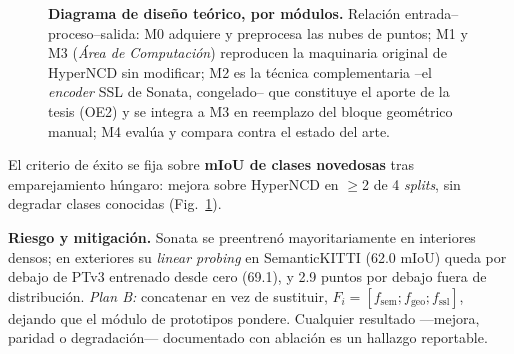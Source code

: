\documentclass[9.5pt,twocolumn,a4paper]{article}
\begin{document}
\begin{figure}[t]
{}
\vspace{-4pt}
\caption{\textbf{Diagrama de diseño teórico, por módulos.} Relación
entrada--proceso--salida: M0 adquiere y preprocesa las nubes de puntos; M1 y
M3 (\emph{Área de Computación}) reproducen la maquinaria original de HyperNCD
sin modificar; M2 es la técnica complementaria --el \emph{encoder} SSL de
Sonata, congelado-- que constituye el aporte de la tesis (OE2) y se integra a
M3 en reemplazo del bloque geométrico manual; M4 evalúa y compara contra el
estado del arte.}
\label{fig:teorico}
\vspace{-6pt}
\end{figure}

El criterio de éxito se fija sobre \textbf{mIoU de clases novedosas} tras
emparejamiento húngaro: mejora sobre HyperNCD en $\geq$2 de 4 \emph{splits},
sin degradar clases conocidas (Fig.~\ref{fig:teorico}).

\textbf{Riesgo y mitigación.} Sonata se preentrenó mayoritariamente en
interiores densos; en exteriores su \emph{linear probing} en SemanticKITTI
(62.0 mIoU) queda por debajo de PTv3 entrenado desde cero (69.1), y 2.9
puntos por debajo fuera de distribución. \emph{Plan B:} concatenar en vez de
sustituir, $F_i=[f_{\mathrm{sem}};f_{\mathrm{geo}};f_{\mathrm{ssl}}]$, dejando
que el módulo de prototipos pondere. Cualquier resultado ---mejora, paridad o
degradación--- documentado con ablación es un hallazgo reportable.
\end{document}
